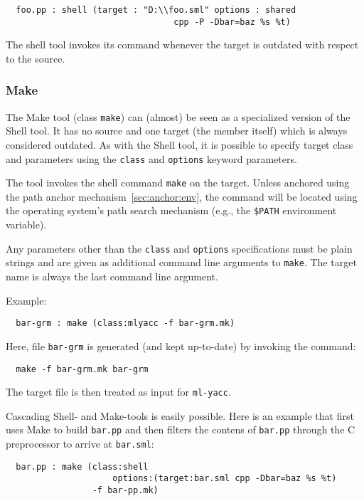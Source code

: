 \documentclass[titlepage,letterpaper]{article}
\begin{document}
\begin{verbatim}
  foo.pp : shell (target : "D:\\foo.sml" options : shared
                                 cpp -P -Dbar=baz %s %t)
\end{verbatim}

The shell tool invokes its command whenever the target is outdated
with respect to the source.

\subsubsection{Make}

The Make tool (class {\tt make}) can (almost) be seen as a specialized
version of the Shell tool.  It has no source and one target (the
member itself) which is always considered outdated.  As with the Shell
tool, it is possible to specify target class and parameters using the
{\tt class} and {\tt options} keyword parameters.

The tool invokes the shell command {\tt make} on the target.  Unless
anchored using the path anchor mechanism~\ref{sec:anchor:env}, the
command will be located using the operating system's path search
mechanism (e.g., the {\tt \$PATH} environment variable).

Any parameters other than the {\tt class} and {\tt options}
specifications must be plain strings and are given as additional
command line arguments to {\tt make}.  The target name is always the
last command line argument.

Example:

\begin{verbatim}
  bar-grm : make (class:mlyacc -f bar-grm.mk)
\end{verbatim}

Here, file {\tt bar-grm} is generated (and kept up-to-date) by
invoking the command:
\begin{verbatim}
  make -f bar-grm.mk bar-grm
\end{verbatim}
\noindent The target file is then treated as input for {\tt ml-yacc}.

Cascading Shell- and Make-tools is easily possible.  Here is an
example that first uses Make to build {\tt bar.pp} and then filters
the contens of {\tt bar.pp} through the C preprocessor to arrive at
{\tt bar.sml}:

\begin{verbatim}
  bar.pp : make (class:shell
                     options:(target:bar.sml cpp -Dbar=baz %s %t)
                 -f bar-pp.mk)
\end{verbatim}
\end{document}
